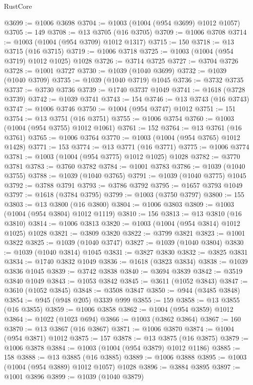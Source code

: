 \begin{lexlean}{RustCore}
\begin{coremodule}
@3699 := @1006 @3698
@3704 := @1003 (@1004 (@954 @3699) @1012 @1057)
@3705 := 149
@3708 := @13 @3705 (@16 @3705)
@3709 := @1006 @3708
@3714 := @1003 (@1004 (@954 @3709) @1012 @1317)
@3715 := 150
@3718 := @13 @3715 (@16 @3715)
@3719 := @1006 @3718
@3725 := @1003 (@1004 (@954 @3719) @1012 @1025) @1028
@3726 := @3714 @3725
@3727 := @3704 @3726
@3728 := @1001 @3727
@3730 := @1039 (@1040 @3699)
@3732 := @1039 (@1040 @3709)
@3735 := @1039 (@1040 @3719) @1045
@3736 := @3732 @3735
@3737 := @3730 @3736
@3739 := @1740 @3737 @1049
@3741 := @1618 (@3728 @3739)
@3742 := @1039 @3741
@3743 := 154
@3746 := @13 @3743 (@16 @3743)
@3747 := @1006 @3746
@3750 := @1004 (@954 @3747) @1012
@3751 := 151
@3754 := @13 @3751 (@16 @3751)
@3755 := @1006 @3754
@3760 := @1003 (@1004 (@954 @3755) @1012 @1061)
@3761 := 152
@3764 := @13 @3761 (@16 @3761)
@3765 := @1006 @3764
@3770 := @1003 (@1004 (@954 @3765) @1012 @1428)
@3771 := 153
@3774 := @13 @3771 (@16 @3771)
@3775 := @1006 @3774
@3781 := @1003 (@1004 (@954 @3775) @1012 @1025) @1028
@3782 := @3770 @3781
@3783 := @3760 @3782
@3784 := @1001 @3783
@3786 := @1039 (@1040 @3755)
@3788 := @1039 (@1040 @3765)
@3791 := @1039 (@1040 @3775) @1045
@3792 := @3788 @3791
@3793 := @3786 @3792
@3795 := @1657 @3793 @1049
@3797 := @1618 (@3784 @3795)
@3799 := @1003 (@3750 @3797)
@3800 := 155
@3803 := @13 @3800 (@16 @3800)
@3804 := @1006 @3803
@3809 := @1003 (@1004 (@954 @3804) @1012 @1119)
@3810 := 156
@3813 := @13 @3810 (@16 @3810)
@3814 := @1006 @3813
@3820 := @1003 (@1004 (@954 @3814) @1012 @1025) @1028
@3821 := @3809 @3820
@3822 := @3799 @3821
@3823 := @1001 @3822
@3825 := @1039 (@1040 @3747)
@3827 := @1039 (@1040 @3804)
@3830 := @1039 (@1040 @3814) @1045
@3831 := @3827 @3830
@3832 := @3825 @3831
@3834 := @1740 @3832 @1049
@3836 := @1618 (@3823 @3834)
@3838 := @1039 @3836 @1045
@3839 := @3742 @3838
@3840 := @3694 @3839
@3842 := @3519 @3840 @1049
@3843 := @1053 @3842
@3845 := @3611 (@1052 @3843)
@3847 := @3610 (@1052 @3845)
@3848 := @3508 @3847
@3850 := @944 (@3485 @3848)
@3854 := @945 (@948 @205) @3339 @999
@3855 := 159
@3858 := @13 @3855 (@16 @3855)
@3859 := @1006 @3858
@3862 := @1004 (@954 @3859) @1012
@3864 := @1022 (@1023 @694)
@3866 := @1003 (@3862 @3864)
@3867 := 160
@3870 := @13 @3867 (@16 @3867)
@3871 := @1006 @3870
@3874 := @1004 (@954 @3871) @1012
@3875 := 157
@3878 := @13 @3875 (@16 @3875)
@3879 := @1006 @3878
@3884 := @1003 (@1004 (@954 @3879) @1012 @1186)
@3885 := 158
@3888 := @13 @3885 (@16 @3885)
@3889 := @1006 @3888
@3895 := @1003 (@1004 (@954 @3889) @1012 @1057) @1028
@3896 := @3884 @3895
@3897 := @1001 @3896
@3899 := @1039 (@1040 @3879)

\end{coremodule}
\end{lexlean}
